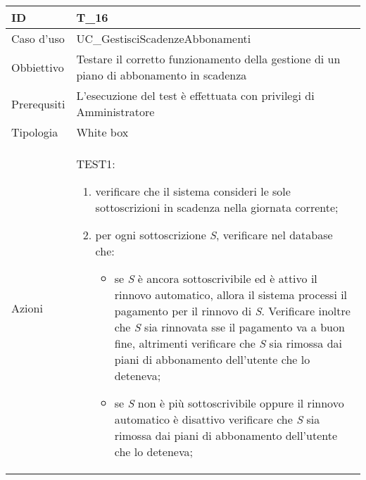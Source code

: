 \begin{table}[hb]
    \centering
    \begin{tabular}{ |p{2cm}|p{10cm}|  }
        \hline
        ID          & T\_16                                                                                   \\\hline
        Caso d'uso  & UC\_GestisciScadenzeAbbonamenti                                                         \\\hline
        Obbiettivo  & Testare il corretto funzionamento della gestione di un piano di abbonamento in scadenza \\\hline
        Prerequsiti & L'esecuzione del test è effettuata con privilegi di Amministratore                      \\\hline
        Tipologia   & White box                                                                               \\\hline
        Azioni      &
        TEST1:
        \begin{enumerate}[nosep, topsep=0pt]
            \item verificare che il sistema consideri le sole sottoscrizioni in scadenza nella giornata corrente;
            \item per ogni sottoscrizione \emph{S}, verificare nel database che:
                  \begin{itemize}
                      \item se \emph{S} è ancora sottoscrivibile ed è attivo il rinnovo automatico, allora il sistema processi il pagamento per il rinnovo di \emph{S}. Verificare inoltre che \emph{S} sia rinnovata sse il pagamento va a buon fine, altrimenti verificare che \emph{S} sia rimossa dai piani di abbonamento dell'utente che lo deteneva;
                      \item se \emph{S} non è più sottoscrivibile oppure il rinnovo automatico è disattivo verificare che \emph{S} sia rimossa dai piani di abbonamento dell'utente che lo deteneva;
                  \end{itemize}
        \end{enumerate}

        \\\hline
    \end{tabular}
\end{table}

